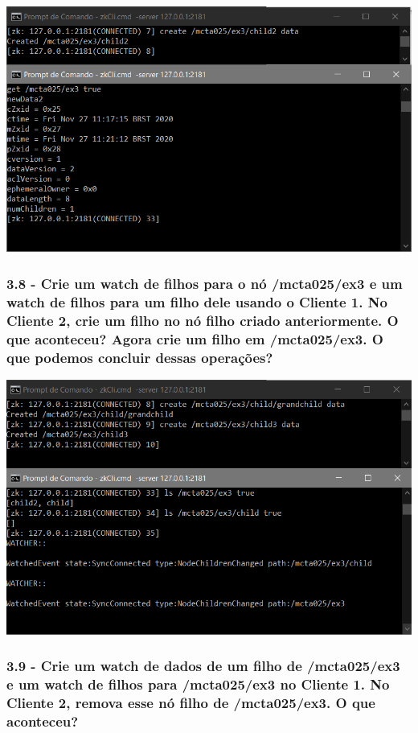\includegraphics{pratica3/prints/roteiro 3.7.PNG}

\subsubsection{3.8 - Crie um watch de filhos para o nó /mcta025/ex3 e um watch de filhos para um filho dele usando o Cliente 1. No Cliente 2, crie um filho no
nó filho criado anteriormente. O que aconteceu? Agora crie um filho
em /mcta025/ex3. O que podemos concluir dessas operações?}

\includegraphics{pratica3/prints/roteiro 3.8.PNG}

\subsubsection{3.9 - Crie um watch de dados de um filho de /mcta025/ex3 e um watch de filhos para /mcta025/ex3 no Cliente 1. No Cliente 2, remova esse nó filho de /mcta025/ex3. O que aconteceu?}

